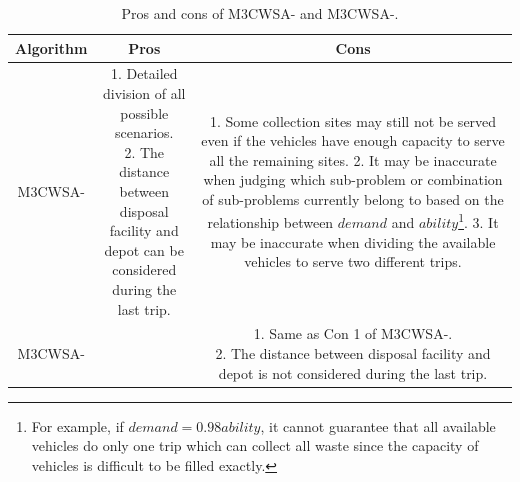 \documentclass[journal]{IEEEtran}
\begin{document}
\begin{table}[htbp]
	\centering
	\caption{\label{tab:m3_cwsas_pc}Pros and cons of M3CWSA-\uppercase\expandafter{} and M3CWSA-\uppercase\expandafter{}.
	}
	\setlength{\tabcolsep}{4pt}
	\begin{tabular}{|c|c|c|}%
		\hline
		\multicolumn{1}{|c|}{\textbf{Algorithm}} & \multicolumn{1}{|c|}{\textbf{Pros}} & \multicolumn{1}{|c|}{\textbf{Cons}}\\
		\hline
		M3CWSA-\uppercase\expandafter{\romannumeral1} & \makecell[l]{1. Detailed division of all possible scenarios.\\ 2. The distance between disposal facility and\\ depot can be considered during the last trip.}  & \makecell[l]{1. Some collection sites may still not be served even if the vehicles have enough capacity\\ to serve all the remaining sites.\\ 2. It may be inaccurate when judging which sub-problem or combination of sub-problems\\ currently belong to based on the relationship between $demand$ and $ability$\footnote{For example, if $demand=0.98ability$, it cannot guarantee that all available vehicles do only one trip which can collect all waste since the capacity of vehicles is difficult to be filled exactly.}.\\ 3. It may be inaccurate when dividing the available vehicles to serve two different trips.}\\
		\hline
		M3CWSA-\uppercase\expandafter{\romannumeral2} & \makecell[l]{
		Easier to understand and implement.} & \makecell[l]{1. Same as Con 1 of M3CWSA-\uppercase\expandafter{\romannumeral1}. \\ 2. The distance between disposal facility and depot is not considered during the last trip.}\\
		\hline
	\end{tabular}
\end{table}


\end{document}
